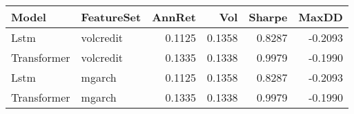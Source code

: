 \begin{tabular}{llrrrr}
\toprule
Model & FeatureSet & AnnRet & Vol & Sharpe & MaxDD \\
\midrule
Lstm & volcredit & 0.1125 & 0.1358 & 0.8287 & -0.2093 \\
Transformer & volcredit & 0.1335 & 0.1338 & 0.9979 & -0.1990 \\
Lstm & mgarch & 0.1125 & 0.1358 & 0.8287 & -0.2093 \\
Transformer & mgarch & 0.1335 & 0.1338 & 0.9979 & -0.1990 \\
\bottomrule
\end{tabular}

